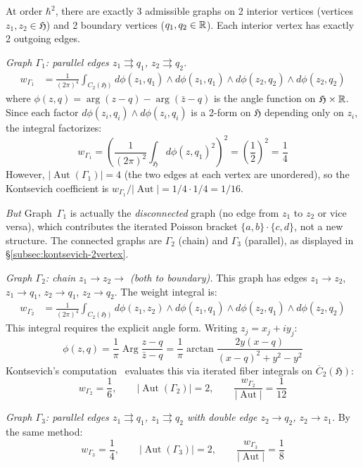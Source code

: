 \begin{computation}
\label{comp:kontsevich-2vertex}

At order $\hbar^2$, there are exactly 3 admissible graphs on 2
interior vertices (vertices $z_1, z_2 \in \mathfrak{H}$) and 2
boundary vertices ($q_1, q_2 \in \mathbb{R}$).  Each interior vertex
has exactly 2 outgoing edges.

\emph{Graph $\Gamma_1$: parallel edges $z_1 \rightrightarrows q_1$,
$z_2 \rightrightarrows q_2$.}
\begin{align*}
w_{\Gamma_1} &= \frac{1}{(2\pi)^4}
\int_{C_2(\mathfrak{H})} d\phi(z_1,q_1) \wedge d\phi(z_1,q_1)
\wedge d\phi(z_2,q_2) \wedge d\phi(z_2,q_2)
\end{align*}
where $\phi(z,q) = \arg(z-q) - \arg(\bar{z}-q)$ is the angle
function on $\mathfrak{H} \times \mathbb{R}$.  Since each factor
$d\phi(z_i,q_i) \wedge d\phi(z_i,q_i)$ is a 2-form on
$\mathfrak{H}$ depending only on $z_i$, the integral factorizes:
\[
w_{\Gamma_1} = \left(\frac{1}{(2\pi)^2}
\int_\mathfrak{H} d\phi(z,q_1)^2\right)^2
= \left(\frac{1}{2}\right)^2 = \frac{1}{4}
\]
However, $|\operatorname{Aut}(\Gamma_1)| = 4$ (the two edges at
each vertex are unordered), so the Kontsevich coefficient is
$w_{\Gamma_1}/|\operatorname{Aut}| = 1/4 \cdot 1/4 = 1/16$.

\emph{But} Graph~$\Gamma_1$ is actually the \emph{disconnected}
graph (no edge from $z_1$ to $z_2$ or vice versa), which contributes
the iterated Poisson bracket $\{a,b\} \cdot \{c,d\}$, not a new
structure.  The connected graphs are $\Gamma_2$ (chain) and
$\Gamma_3$ (parallel), as displayed in
\S\ref{subsec:kontsevich-2vertex}.

\emph{Graph $\Gamma_2$: chain $z_1 \to z_2 \to$ (both to boundary).}
This graph has edges $z_1 \to z_2$, $z_1 \to q_1$, $z_2 \to q_1$,
$z_2 \to q_2$.  The weight integral is:
\begin{align*}
w_{\Gamma_2} &= \frac{1}{(2\pi)^4}
\int_{C_2(\mathfrak{H})}
d\phi(z_1,z_2) \wedge d\phi(z_1,q_1)
\wedge d\phi(z_2,q_1) \wedge d\phi(z_2,q_2)
\end{align*}
This integral requires the explicit angle form.  Writing $z_j = x_j + iy_j$:
\[
\phi(z,q) = \frac{1}{\pi}\operatorname{Arg}\frac{z-q}{\bar{z}-q}
= \frac{1}{\pi}\arctan\frac{2y(x-q)}{(x-q)^2+y^2-y^2}
\]
Kontsevich's computation~\cite{Kontsevich03} evaluates this via
iterated fiber integrals on $\overline{C}_2(\mathfrak{H})$:
\[
w_{\Gamma_2} = \frac{1}{6}, \qquad
|\operatorname{Aut}(\Gamma_2)| = 2, \qquad
\frac{w_{\Gamma_2}}{|\operatorname{Aut}|} = \frac{1}{12}
\]

\emph{Graph $\Gamma_3$: parallel edges $z_1 \rightrightarrows q_1$,
$z_1 \rightrightarrows q_2$ with double edge $z_2 \to q_2$,
$z_2 \to z_1$.}
By the same method:
\[
w_{\Gamma_3} = \frac{1}{4}, \qquad
|\operatorname{Aut}(\Gamma_3)| = 2, \qquad
\frac{w_{\Gamma_3}}{|\operatorname{Aut}|} = \frac{1}{8}
\]
\end{computation}

